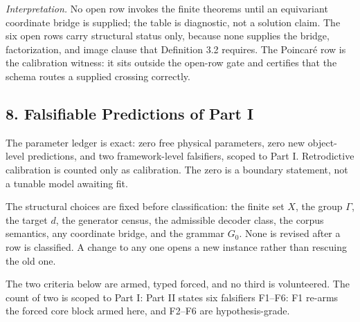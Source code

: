 \documentclass[10pt,twocolumn]{article}
\begin{document}
\emph{Interpretation.} No open row invokes the finite theorems until an
equivariant coordinate bridge is supplied; the table is diagnostic, not
a solution claim. The six open rows carry structural status only,
because none supplies the bridge, factorization, and image clause that
Definition 3.2 requires. The Poincaré row is the calibration witness: it
sits outside the open-row gate and certifies that the schema routes a
supplied crossing correctly.

\subsection{8. Falsifiable Predictions of Part
I}\label{falsifiable-predictions-of-part-i}

The parameter ledger is exact: zero free physical parameters, zero new
object-level predictions, and two framework-level falsifiers, scoped to
Part I. Retrodictive calibration is counted only as calibration. The
zero is a boundary statement, not a tunable model awaiting fit.

The structural choices are fixed before classification: the finite set
\(X\), the group \(\Gamma\), the target \(d\), the generator census, the
admissible decoder class, the corpus semantics, any coordinate bridge,
and the grammar \(G_0\). None is revised after a row is classified. A
change to any one opens a new instance rather than rescuing the old one.

The two criteria below are armed, typed forced, and no third is
volunteered. The count of two is scoped to Part I: Part II states six
falsifiers F1--F6: F1 re-arms the forced core block armed here, and
F2--F6 are hypothesis-grade.
\end{document}
